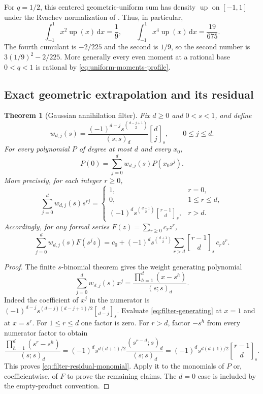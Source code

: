 \documentclass[11pt,a4paper]{article}
\numberwithin{equation}{section}
\newtheorem{theorem}{Theorem}[section]
\theoremstyle{definition}
\theoremstyle{remark}
\newcommand{\Gb}[3]{\genfrac{[}{]}{0pt}{}{#1}{#2}_{#3}}
\newcommand{\dd}{\,\mathrm d}
\begin{document}
For $q=1/2$, this centered geometric-uniform sum has density
$\operatorname{up}$ on $[-1,1]$ under the Rvachev normalization of
\cite{fabiusrepo}. Thus, in particular,
\begin{equation}
 \int_{-1}^1x^2\operatorname{up}(x)\dd x=\frac19,
 \qquad
 \int_{-1}^1x^4\operatorname{up}(x)\dd x=\frac{19}{675}.
 \label{eq:up-moment-examples}
\end{equation}
The fourth cumulant is $-2/225$ and the second is $1/9$, so the second
number is $3(1/9)^2-2/225$. More generally every even moment at a
rational base $0<q<1$ is rational by
\cref{eq:uniform-moments-profile}.

\subsection{Exact geometric extrapolation and its residual}
\begin{theorem}[Gaussian annihilation filter]
Fix $d\ge0$ and $0<s<1$, and define
\begin{equation}
 w_{d,j}(s)=
 \frac{(-1)^{d-j}s^{\binom{d-j+1}2}}{(s;s)_d}
             \Gb dj s,\qquad 0\le j\le d.
 \label{eq:filter-weights}
\end{equation}
For every polynomial $P$ of degree at most $d$ and every $x_0$,
\begin{equation}
 P(0)=\sum_{j=0}^d w_{d,j}(s)P(x_0s^j).
 \label{eq:filter-exact}
\end{equation}
More precisely, for each integer $r\ge0$,
\begin{equation}
 \sum_{j=0}^d w_{d,j}(s)s^{rj}=
 \begin{cases}
  1,&r=0,\\
  0,&1\le r\le d,\\
  (-1)^d s^{\binom{d+1}2}\Gb{r-1}d s,&r>d.
 \end{cases}
 \label{eq:filter-residual-monomial}
\end{equation}
Accordingly, for any formal series $F(z)=\sum_{r\ge0}c_rz^r$,
\begin{equation}
 \sum_{j=0}^d w_{d,j}(s)F(s^jz)
  =c_0+(-1)^ds^{\binom{d+1}2}
             \sum_{r>d}\Gb{r-1}d s\,c_rz^r.
 \label{eq:filter-residual-series}
\end{equation}
\end{theorem}
\begin{proof}
The finite $s$-binomial theorem gives the weight generating polynomial
\begin{equation}
 \sum_{j=0}^d w_{d,j}(s)x^j
       =\frac{\prod_{h=1}^d(x-s^h)}{(s;s)_d}.
 \label{eq:filter-generating}
\end{equation}
Indeed the coefficient of $x^j$ in the numerator is
$(-1)^{d-j}s^{(d-j)(d-j+1)/2}\Gb d{d-j}s$.
Evaluate \cref{eq:filter-generating} at $x=1$ and at $x=s^r$.
For $1\le r\le d$ one factor is zero. For $r>d$, factor
$-s^h$ from every numerator factor to obtain
\[
 \frac{\prod_{h=1}^d(s^r-s^h)}{(s;s)_d}
   =(-1)^ds^{d(d+1)/2}\frac{(s^{r-d};s)_d}{(s;s)_d}
   =(-1)^ds^{d(d+1)/2}\Gb{r-1}d s.
\]
This proves \cref{eq:filter-residual-monomial}. Apply it to the
monomials of $P$ or, coefficientwise, of $F$ to prove the remaining
claims. The $d=0$ case is included by the empty-product convention.
\end{proof}
\end{document}
